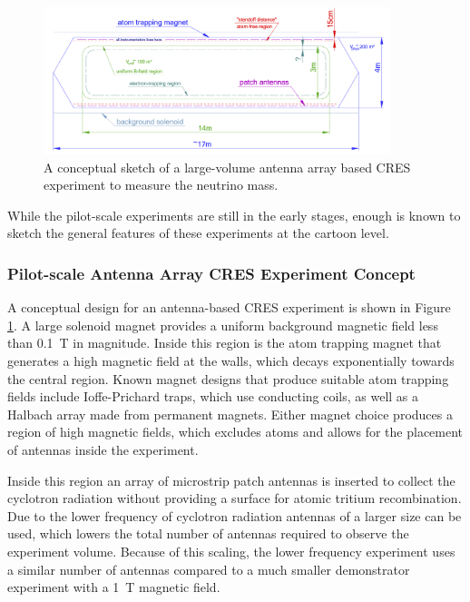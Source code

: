 \begin{figure}[htbp]
    \centering
    \includegraphics*[width=0.9\textwidth]{figs/Chapter-3/phaseiv_concept_sketch_ver2.png}
    \caption{\label{fig:chap3-phaseiv-antenna} A conceptual sketch of a large-volume antenna array based CRES experiment to measure the neutrino mass.}
\end{figure}

While the pilot-scale experiments are still in the early stages, enough is known to sketch the general features of these experiments at the cartoon level. 

\subsubsection*{Pilot-scale Antenna Array CRES Experiment Concept}

A conceptual design for an antenna-based CRES experiment is shown in Figure \ref{fig:chap3-phaseiv-antenna}. A large solenoid magnet provides a uniform background magnetic field less than 0.1~T in magnitude. Inside this region is the atom trapping magnet that generates a high magnetic field at the walls, which decays exponentially towards the central region. 
Known magnet designs that produce suitable atom trapping fields include Ioffe-Prichard traps, which use conducting coils, as well as a Halbach array made from permanent magnets. Either magnet choice produces a region of high magnetic fields, which excludes atoms and allows for the placement of antennas inside the experiment. 

Inside this region an array of microstrip patch antennas is inserted to collect the cyclotron radiation without providing a surface for atomic tritium recombination. Due to the lower frequency of cyclotron radiation antennas of a larger size can be used, which lowers the total number of antennas required to observe the experiment volume. Because of this scaling, the lower frequency experiment uses a similar number of antennas compared to a much smaller demonstrator experiment with a 1~T magnetic field.

